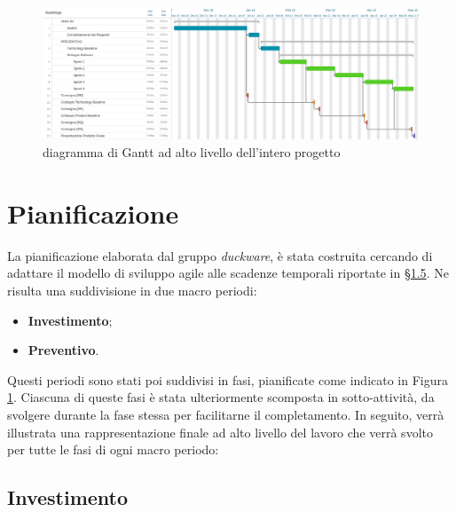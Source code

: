 \clearpage
\begin{landscape}
	\begin{figure}[htbp]
	\centering
		\includegraphics[width=\linewidth ,keepaspectratio]{../includes/pics/grafici/Swetlapp.jpeg}
		\caption{\label{fig:gantt-swetlapp}diagramma di Gantt ad alto livello dell'intero progetto}
	\end{figure}
\end{landscape}
\clearpage
\section{Pianificazione}
\label{sec:pianificazione}
La pianificazione elaborata dal gruppo \emph{duckware}, è stata costruita cercando di adattare il modello di sviluppo agile alle scadenze temporali riportate in \hyperlink{scadenze}{§1.5}. Ne risulta una suddivisione in due macro periodi: 
\begin{itemize}
	\item \textbf{Investimento};
	\item \textbf{Preventivo}.
\end{itemize}
Questi periodi sono stati poi suddivisi in fasi, pianificate come indicato in Figura \ref{fig:gantt-swetlapp}. 
Ciascuna di queste fasi è stata ulteriormente scomposta in sotto-attività, da svolgere durante la fase stessa per facilitarne il completamento. In seguito, verrà illustrata una rappresentazione finale ad alto livello del lavoro che verrà svolto per tutte le fasi di ogni macro periodo:
\subsection{Investimento}
\label{sec:investimento}
